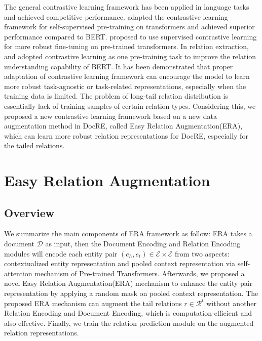 \documentclass[11pt]{article}
\begin{document}
The general contrastive learning framework has been applied in language tasks and achieved competitive performance.  \citet{fang_cert_2020} adapted the contrastive learning framework for self-supervised pre-training on transformers and achieved superior performance compared to BERT\cite{devlin-etal-2019-bert}. \citet{sclnlp_gunel_2021} proposed to use supervised contrastive learning for more robust fine-tuning on pre-trained transformers. In relation extraction, \citet{peng-etal-2020-learning} and \citet{qin-etal-2021-erica} adopted contrastive learning as one pre-training task to improve the relation understanding capability of BERT. It has been demonstrated that proper adaptation of contrastive learning framework can encourage the model to learn more robust task-agnostic or task-related representations, especially when the training data is limited. The problem of long-tail relation distribution is essentially lack of training samples of certain relation types. Considering this, we proposed a new contrastive learning framework based on a new data augmentation method in DocRE, called Easy Relation Augmentation(ERA), which can learn more robust relation representations for DocRE, especially for the tailed relations.

\section{Easy Relation Augmentation}
\subsection{Overview}
We summarize the main components of ERA framework as follow: ERA takes a document $\mathcal{D}$ as input, then the Document Encoding and Relation Encoding modules will encode each entity pair $(e_h,e_t) \in \mathcal{E} \times \mathcal{E}$ from two aspects: contextualized entity representation and pooled context representation via self-attention mechanism of Pre-trained Transformers\citep{zhou_atlop_2021}. Afterwards, we proposed a novel Easy Relation Augmentation(ERA) mechanism to enhance the entity pair representation by applying a random mask on pooled context representation. The proposed ERA mechanism can augment the tail relations $r \in \mathcal{R}^t$ without another Relation Encoding and Document Encoding, which is computation-efficient and also effective. Finally, we train the relation prediction module on the augmented relation representations.
\end{document}
